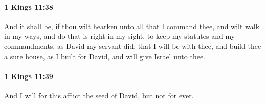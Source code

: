 		\paragraph{1 Kings 11:38} %
			\label{1KINGS-11-38}

			And it shall be, if thou wilt hearken unto all that I command thee, and wilt walk in my ways, and do that is right in my sight, to keep my statutes and my commandments, as David my servant did; that I will be with thee, and build thee a sure house, as I built for David, and will give Israel unto thee.


		\paragraph{1 Kings 11:39} %
			\label{1KINGS-11-39}

			And I will for this afflict the seed of David, but not for ever.



